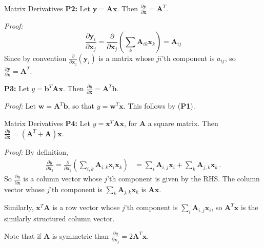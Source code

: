 \documentclass[10pt,handout]{beamer}
\begin{document}
\begin{frame}[fragile]{Matrix Derivatives}
\textbf{P2:} Let $\mathbf{y} = \mathbf{Ax}.$ Then $\frac{\partial \mathbf{y}}{\partial \mathbf{x}} = \mathbf{A}^T$. \pause

\emph{Proof:}
$$
\frac{\partial \mathbf{y}_i}{\partial \mathbf{x}_j} = \frac{\partial}{\partial \mathbf{x}_j} \left(\sum_{k} \mathbf{A}_{ik} \mathbf{x}_k\right) = \mathbf{A}_{ij}
$$
Since by convention $\frac{\partial}{\partial \mathbf{x}_j} \left(\mathbf{y}_i\right)$ is a matrix whose $ji$'th component is $a_{ij}$, so $\frac{\partial \mathbf{y}}{\partial \mathbf{x}} = \mathbf{A}^T$.\pause\vspace{2em}

\textbf{P3:} Let $y = \mathbf{b}^T\mathbf{Ax}.$ Then $\frac{\partial y}{\partial \mathbf{x}} = \mathbf{A}^T\mathbf{b}$. \pause

\emph{Proof:}
Let $\mathbf{w} = \mathbf{A}^T\mathbf{b}$, so that $y = \mathbf{w}^T\mathbf{x}$. This follows by (\textbf{P1}). 
\end{frame}



\begin{frame}[fragile]{Matrix Derivatives}
\textbf{P4:} Let $y = \mathbf{x}^T\mathbf{Ax}$, for $\mathbf{A}$ a square matrix. Then $\frac{\partial y}{\partial \mathbf{x}} = (\mathbf{A}^T+\mathbf{A})\mathbf{x}$. \pause

\emph{Proof:}
By definition,
\begin{align*}
\frac{\partial y}{\partial \mathbf{x}_j}  = \frac{\partial}{\partial \mathbf{x}_j} \left(\sum_{i,k} \mathbf{A}_{i,k} \mathbf{x}_i \mathbf{x}_k\right) &= \sum_{i} \mathbf{A}_{i,j} \mathbf{x}_i + \sum_{k} \mathbf{A}_{j,k}  \mathbf{x}_k
\,.
\end{align*}
So $\frac{\partial y}{\partial \mathbf{x}} $ is a column vector whose $j$'th component is given by the RHS. The column vector whose $j$'th component is $\sum_{k} \mathbf{A}_{j,k} \mathbf{x}_k $ is $\mathbf{Ax}$.

Similarly, $\mathbf{x}^T\mathbf{A}$ is a row vector whose $j$'th component is $ \sum_{i} \mathbf{A}_{i,j} \mathbf{x}_i $, so $\mathbf{A}^T\mathbf{x}$ is the similarly structured column vector. \newline\pause


Note that if $\mathbf{A}$ is symmetric than $\frac{\partial y}{\partial \mathbf{x}_j}  = 2\mathbf{A}^T \mathbf{x}$.
\end{frame}
\end{document}
